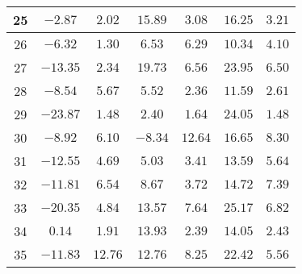\begin{table}[H]
\begin{tabular}{|c|c|c|c|c|c|c|}
                        25   &  $-2.87$    &  $2.02$   &  $15.89$   &  $3.08$  &  $16.25$ &  $3.21$   \\ \hline
                        26   &  $-6.32$    &  $1.30$   &  $6.53$    &  $6.29$  &  $10.34$ &  $4.10$   \\ \hline
                        27   &  $-13.35$   &  $2.34$   &  $19.73$   &  $6.56$  &  $23.95$ &  $6.50$   \\ \hline
                        28   &  $-8.54$    &  $5.67$   &  $5.52$    &  $2.36$  &  $11.59$ &  $2.61$   \\ \hline
                        29   &  $-23.87$   &  $1.48$   &  $2.40$    &  $1.64$  &  $24.05$ &  $1.48$   \\ \hline
                        30   &  $-8.92$    &  $6.10$   &  $-8.34$   &  $12.64$ &  $16.65$ &  $8.30$   \\ \hline
                        31   &  $-12.55$   &  $4.69$   &  $5.03$    &  $3.41$  &  $13.59$ &  $5.64$   \\ \hline
                        32   &  $-11.81$   &  $6.54$   &  $8.67$    &  $3.72$  &  $14.72$ &  $7.39$   \\ \hline
                        33   &  $-20.35$   &  $4.84$   &  $13.57$   &  $7.64$  &  $25.17$ &  $6.82$   \\ \hline
                        34   &  $0.14$     &  $1.91$   &  $13.93$   &  $2.39$  &  $14.05$ &  $2.43$   \\ \hline
                        35   &  $-11.83$   &  $12.76$  &  $12.76$   &  $8.25$  &  $22.42$ &  $5.56$   \\ \hline
        \end{tabular}
    \label{tab:media_lab_6_aleatoria}
\end{table}

